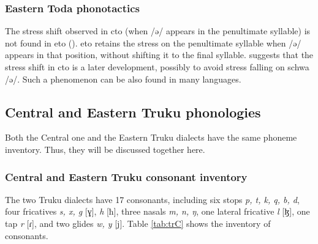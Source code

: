 \subsubsection{Eastern Toda phonotactics} \label{sec:eto_phonotactics}


The stress shift observed in \acl{cto} (when /ə/ appears in the penultimate syllable) is not found in \acl{eto} (\cite[96--97]{lee2015tawsa}). \acl{eto} retains the stress on the penultimate syllable when /ə/ appears in that position, without shifting it to the final syllable. \textcite[97]{lee2015tawsa} suggests that the stress shift in \acl{cto} is a later development, possibly to avoid stress falling on schwa /ə/. Such a phenomenon can be also found in many languages.

\subsection{Central and Eastern Truku phonologies}
Both the Central one and the Eastern Truku dialects have the same phoneme inventory. Thus, they will be discussed together here. 

\subsubsection{Central and Eastern Truku consonant inventory}

The two Truku dialects have 17 consonants, including six stops \textit{p, t, k, q, b, d}, four fricatives \textit{s, x, g} [ɣ], \textit{h} [ħ], three nasals \textit{m, n, ŋ}, one lateral fricative \textit{l} [ɮ], one tap \textit{r} [ɾ], and two glides \textit{w, y} [j]. Table \ref{tab:trC} shows the inventory of consonants.

